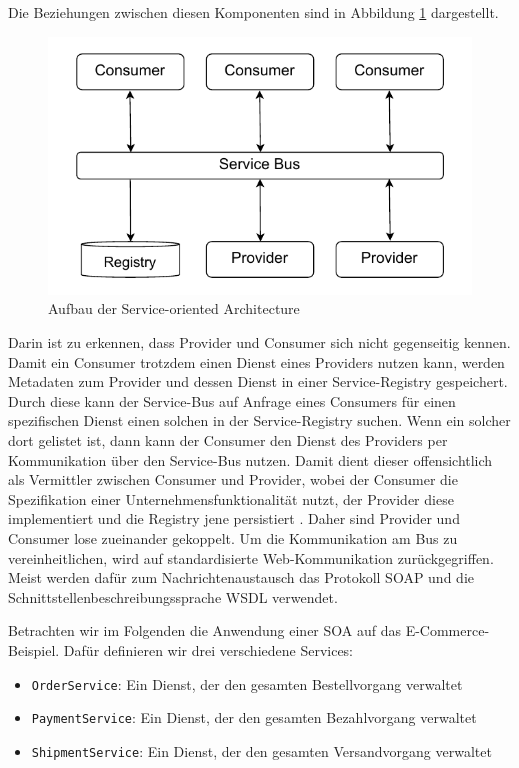 \documentclass[acmtog]{acmart}
\begin{document}
Die Beziehungen zwischen diesen Komponenten sind in Abbildung \ref{fig:soa} dargestellt.
\begin{figure}[!h]
  \centering
  \includegraphics[width=0.8\linewidth]{images/soa/soa.pdf}
  \caption{Aufbau der Service-oriented Architecture}
  \label{fig:soa}
\end{figure}
Darin ist zu erkennen, dass Provider und Consumer sich nicht gegenseitig kennen.
Damit ein Consumer trotzdem einen Dienst eines Providers nutzen kann, werden Metadaten zum Provider und dessen Dienst in einer Service-Registry gespeichert.
Durch diese kann der Service-Bus auf Anfrage eines Consumers für einen spezifischen Dienst einen solchen in der Service-Registry suchen.
Wenn ein solcher dort gelistet ist, dann kann der Consumer den Dienst des Providers per Kommunikation über den Service-Bus nutzen.
Damit dient dieser offensichtlich als Vermittler zwischen Consumer und Provider, wobei der Consumer die Spezifikation einer Unternehmensfunktionalität nutzt,
der Provider diese implementiert und die Registry jene persistiert \cite[16]{soa2}\cite[19-26]{soa4}.
Daher sind Provider und Consumer lose zueinander gekoppelt.
Um die Kommunikation am Bus zu vereinheitlichen, wird auf standardisierte Web-Kommunikation zurückgegriffen.
Meist werden dafür zum Nachrichtenaustausch das Protokoll SOAP und die Schnittstellenbeschreibungssprache WSDL verwendet. %

Betrachten wir im Folgenden die Anwendung einer SOA auf das E-Commerce-Beispiel.
Dafür definieren wir drei verschiedene Services:
\begin{itemize}
  \item \texttt{OrderService}: Ein Dienst, der den gesamten Bestellvorgang verwaltet
  \item \texttt{PaymentService}: Ein Dienst, der den gesamten Bezahlvorgang verwaltet
  \item \texttt{ShipmentService}: Ein Dienst, der den gesamten Versandvorgang verwaltet
\end{itemize}
\end{document}
